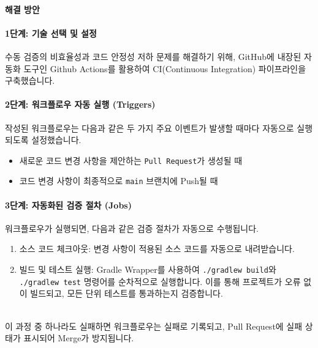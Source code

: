 \documentclass[12pt,a4paper]{article}
\begin{document}

    \paragraph{해결 방안}



    \paragraph{1단계: 기술 선택 및 설정} \par
    수동 검증의 비효율성과 코드 안정성 저하 문제를 해결하기 위해, GitHub에 내장된 자동화 도구인 Github Actions를 활용하여 CI(Continuous Integration) 파이프라인을 구축했습니다.\\

    \vspace{1em}


    \paragraph{2단계: 워크플로우 자동 실행 (Triggers)} \par
    작성된 워크플로우는 다음과 같은 두 가지 주요 이벤트가 발생할 때마다 자동으로 실행되도록 설정했습니다.
    \begin{itemize}
        \item 새로운 코드 변경 사항을 제안하는 \texttt{Pull Request}가 생성될 때
        \item 코드 변경 사항이 최종적으로 \texttt{main} 브랜치에 Push될 때
    \end{itemize}

    \vspace{1em}


    \paragraph{3단계: 자동화된 검증 절차 (Jobs)} \par
    워크플로우가 실행되면, 다음과 같은 검증 절차가 자동으로 수행됩니다.
    \begin{enumerate}
        \item 소스 코드 체크아웃: 변경 사항이 적용된 소스 코드를 자동으로 내려받습니다.
        \item 빌드 및 테스트 실행: Gradle Wrapper를 사용하여 \texttt{./gradlew build}와 \texttt{./gradlew test} 명령어를 순차적으로 실행합니다. 이를 통해 프로젝트가 오류 없이 빌드되고, 모든 단위 테스트를 통과하는지 검증합니다.
    \end{enumerate}
    \\이 과정 중 하나라도 실패하면 워크플로우는 실패로 기록되고, Pull Request에 실패 상태가 표시되어 Merge가 방지됩니다.\\
\end{document}
